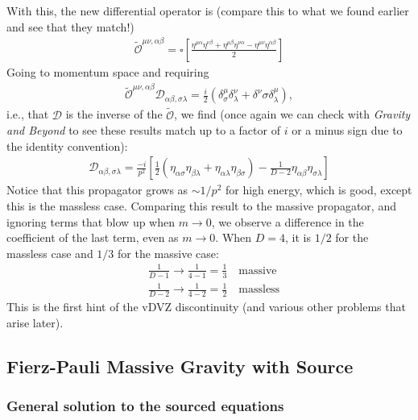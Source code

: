 \documentclass{book}
\theoremstyle{definition}
\newcommand{\nn}{\nonumber}
\newcommand{\f}[2]{\frac{#1}{#2}}
\newcommand{\lp}{\left(}
\newcommand{\rp}{\right)}
\newcommand{\lb}{\left[}
\newcommand{\rb}{\right]}
\newcommand{\D}{\mathcal{D}}
\begin{document}
With this, the new differential operator is (compare this to what we found earlier and see that they match!)
\begin{align}
\tilde{\mathcal{O}}^{\mu\nu,\alpha\beta} = \square\lb \f{\eta^{\mu\alpha}\eta^{\nu\beta} + \eta^{\mu\beta}\eta^{\nu\alpha} - \eta^{\mu\nu}\eta^{\alpha\beta}}{2}\rb
\end{align}
Going to momentum space and requiring 
\begin{align}
\tilde{\mathcal{O}}^{\mu\nu,\alpha\beta} \D_{\alpha\beta,\sigma\lambda} = \f{i}{2}\lp \delta^\mu_\sigma \delta^\nu_\lambda + \delta^\nu\sigma \delta^\mu_\lambda \rp,
\end{align}
i.e., that $\D$ is the inverse of the $\tilde{\mathcal{O}}$, we find (once again we can check with \textit{Gravity and Beyond} to see these results match up to a factor of $i$ or a minus sign due to the identity convention):
\begin{align}
\boxed{\D_{\alpha\beta,\sigma\lambda} = \f{-i}{p^2}\lb \f{1}{2}\lp \eta_{\alpha\sigma}\eta_{\beta\lambda} + \eta_{\alpha\lambda}\eta_{\beta\sigma} \rp - \f{1}{D-2}\eta_{\alpha\beta}\eta_{\sigma\lambda} \rb}
\end{align}
Notice that this propagator grows as $\sim 1/p^2$ for high energy, which is good, except this is the massless case. Comparing this result to the massive propagator, and ignoring terms that blow up when $m \to 0$, we observe a difference in the coefficient of the last term, even as $m\to 0$. When $D=4$, it is $1/2$ for the massless case and $1/3$ for the massive case:
\begin{align}
&\f{1}{D-1} \to \f{1}{4-1} = \f{1}{3}\quad \text{massive}\nn\\
&\f{1}{D-2} \to \f{1}{4-2} = \f{1}{2}\quad \text{massless}
\end{align}
This is the first hint of the vDVZ discontinuity (and various other problems that arise later).  





\newpage



\subsection{Fierz-Pauli Massive Gravity with Source}

\subsubsection{General solution to the sourced equations}
\end{document}
